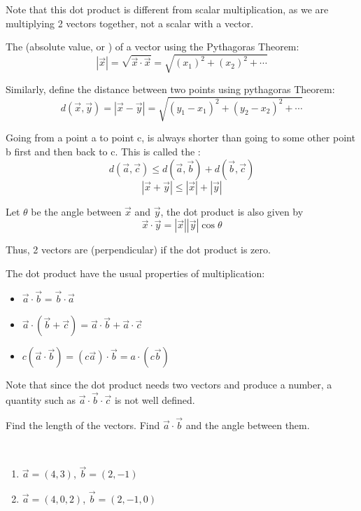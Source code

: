 \documentclass[11pt,fleqn]{book} %
\begin{document}
Note that this dot product is different from scalar multiplication, as we are multiplying 2 vectors together, not a scalar with a vector.

The  (absolute value, or ) of a vector using the Pythagoras Theorem: $$| \vec{x} | = \sqrt{\vec{x} \cdot \vec{x}} = \sqrt{(x_1)^2 + (x_2)^2 + \cdots}$$

Similarly, define the distance between two points using pythagoras Theorem: $$d(\vec{x}, \vec{y}) = | \vec{x} - \vec{y} | = \sqrt{(y_1 - x_1)^2 + (y_2 - x_2)^2 + \cdots}$$

Going from a point a to point c, is always shorter than going to some other point b first and then back to c. This is called the : $$d(\vec{a},\vec{c}) \le d(\vec{a},\vec{b}) + d(\vec{b},\vec{c})$$ $$| \vec{x} + \vec{y} | \le | \vec{x} | + | \vec{y} |$$

Let $\theta$ be the angle between $\vec{x}$ and $\vec{y}$, the dot product is also given by $$\vec{x} \cdot \vec{y} = | \vec{x} | | \vec{y} | \cos \theta$$

Thus, 2 vectors are  (perpendicular) if the dot product is zero.

The dot product have the usual properties of multiplication:

\begin{itemize}
    \item $\vec{a} \cdot \vec{b} = \vec{b} \cdot \vec{a}$
    \item $\vec{a} \cdot (\vec{b} + \vec{c}) = \vec{a} \cdot \vec{b} + \vec{a} \cdot \vec{c}$
    \item $c(\vec{a} \cdot \vec{b}) = (c\vec{a}) \cdot \vec{b} = a \cdot (c\vec{b})$
\end{itemize}

Note that since the dot product needs two vectors and produce a number, a quantity such as $\vec{a} \cdot \vec{b} \cdot \vec{c}$ is not well defined.

\begin{exercise}
    Find the length of the vectors. Find $\vec{a} \cdot \vec{b}$ and the angle between them.

    {~~~}

    \begin{enumerate}
        \item $\vec{a} = (4, 3)$, $\vec{b} = (2, -1)$
        \item $\vec{a} = (4, 0, 2)$, $\vec{b} = (2, -1, 0)$
    \end{enumerate}
\end{exercise}
\end{document}
